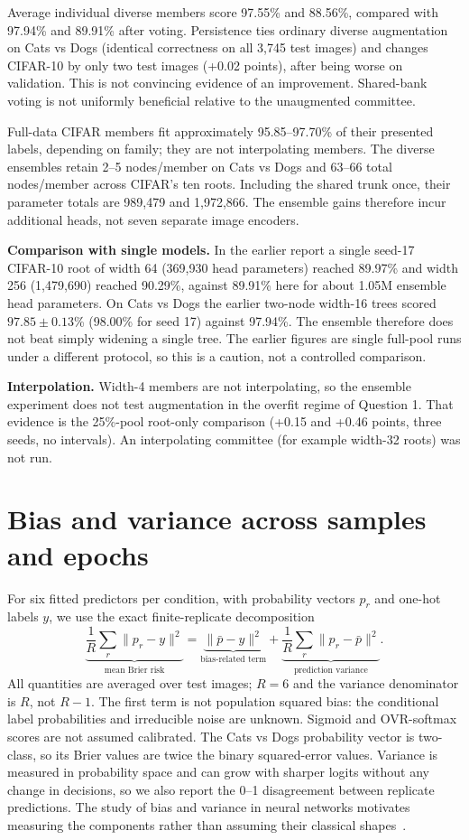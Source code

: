 \documentclass[11pt,a4paper]{article}
\begin{document}
Average individual diverse members score 97.55\% and 88.56\%, compared with 97.94\% and 89.91\% after voting. Persistence ties ordinary diverse augmentation on Cats vs Dogs (identical correctness on all 3,745 test images) and changes CIFAR-10 by only two test images (+0.02 points), after being worse on validation. This is not convincing evidence of an improvement. Shared-bank voting is not uniformly beneficial relative to the unaugmented committee.

Full-data CIFAR members fit approximately 95.85--97.70\% of their presented labels, depending on family; they are not interpolating members. The diverse ensembles retain 2--5 nodes/member on Cats vs Dogs and 63--66 total nodes/member across CIFAR's ten roots. Including the shared trunk once, their parameter totals are 989,479 and 1,972,866. The ensemble gains therefore incur additional heads, not seven separate image encoders.

\textbf{Comparison with single models.} In the earlier report a single seed-17 CIFAR-10 root of width 64 (369,930 head parameters) reached 89.97\% and width 256 (1,479,690) reached 90.29\%, against 89.91\% here for about 1.05M ensemble head parameters. On Cats vs Dogs the earlier two-node width-16 trees scored $97.85\pm0.13$\% (98.00\% for seed 17) against 97.94\%. The ensemble therefore does not beat simply widening a single tree. The earlier figures are single full-pool runs under a different protocol, so this is a caution, not a controlled comparison.

\textbf{Interpolation.} Width-4 members are not interpolating, so the ensemble experiment does not test augmentation in the overfit regime of Question 1. That evidence is the 25\%-pool root-only comparison (+0.15 and +0.46 points, three seeds, no intervals). An interpolating committee (for example width-32 roots) was not run.

\section{Bias and variance across samples and epochs}
For six fitted predictors per condition, with probability vectors $p_r$ and one-hot labels $y$, we use the exact finite-replicate decomposition
\[
 \underbrace{\frac1R\sum_r\|p_r-y\|^2}_{\text{mean Brier risk}}
 =\underbrace{\|\bar p-y\|^2}_{\text{bias-related term}}
 +\underbrace{\frac1R\sum_r\|p_r-\bar p\|^2}_{\text{prediction variance}}.
\]
All quantities are averaged over test images; $R=6$ and the variance denominator is $R$, not $R-1$. The first term is not population squared bias: the conditional label probabilities and irreducible noise are unknown. Sigmoid and OVR-softmax scores are not assumed calibrated. The Cats vs Dogs probability vector is two-class, so its Brier values are twice the binary squared-error values. Variance is measured in probability space and can grow with sharper logits without any change in decisions, so we also report the 0--1 disagreement between replicate predictions. The study of bias and variance in neural networks motivates measuring the components rather than assuming their classical shapes~\cite{yang}.
\end{document}
